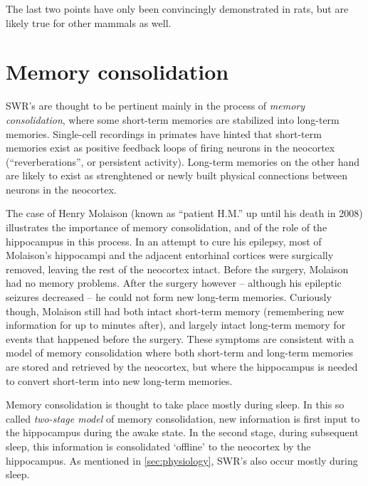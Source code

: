 The last two points have only been convincingly demonstrated in rats, but are likely true for other mammals as well.




\section{Memory consolidation}

SWR's are thought to be pertinent mainly in the process of \emph{memory consolidation}, where some short-term memories are stabilized into long-term memories. Single-cell recordings in primates have hinted that short-term memories exist as positive feedback loops of firing neurons in the neocortex (``reverberations'', or persistent activity). Long-term memories on the other hand are likely to exist as strenghtened or newly built physical connections between neurons in the neocortex. \cite{Kandel2013,Bear2015,Purves2017}

The case of Henry Molaison (known as ``patient H.M.'' up until his death in 2008) illustrates the importance of memory consolidation, and of the role of the hippocampus in this process. In an attempt to cure his epilepsy, most of Molaison's hippocampi and the adjacent entorhinal cortices were surgically removed, leaving the rest of the neocortex intact. Before the surgery, Molaison had no memory problems. After the surgery however -- although his epileptic seizures decreased -- he could not form new long-term memories.\footnotemark{} Curiously though, Molaison still had both intact short-term memory (remembering new information for up to minutes after), and largely intact long-term memory for events that happened before the surgery. These symptoms are consistent with a model of memory consolidation where both short-term and long-term memories are stored and retrieved by the neocortex, but where the hippocampus is needed to convert short-term into new long-term memories. \cite{Kandel2013,Purves2017}


Memory consolidation is thought to take place mostly during sleep. In this so called \emph{two-stage model} of memory consolidation, new information is first input to the hippocampus during the awake state. In the second stage, during subsequent sleep, this information is consolidated `offline' to the neocortex by the hippocampus. As mentioned in \cref{sec:physiology}, SWR's also occur mostly during sleep.





